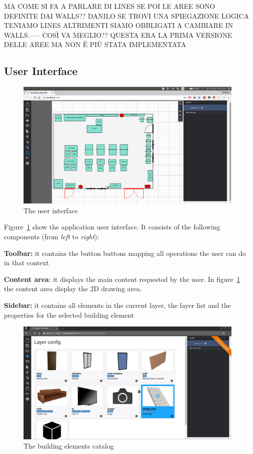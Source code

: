 MA COME SI FA A PARLARE DI LINES SE POI LE AREE SONO DEFINITE DAI WALLS?? DANILO SE TROVI UNA SPIEGAZIONE LOGICA TENIAMO LINES ALTRIMENTI SIAMO OBBLIGATI A CAMBIARE IN WALLS.----- COS\`I VA MEGLIO?? QUESTA ERA LA PRIMA VERSIONE DELLE AREE MA NON \`E PI\`U STATA IMPLEMENTATA


\subsection{User Interface}\label{ssec:ui}

\begin{figure}[htb]
\centering
\includegraphics[width=\linewidth]{contents/images/fig2d}
\caption{The user interface}
\label{fig2D}
\end{figure}

Figure~\ref{fig2D} show the application user interface. It consists of the following components (from \textit{left} to \textit{right}):

\textbf{Toolbar:} it contains the button buttons mapping all operations the user can do in that context

\textbf{Content area}: it displays the main content requested by the user. In figure~\ref{fig2D} the content area display the 2D drawing area.

\textbf{Sidebar:} it contains all elements in the current layer, the layer list and the properties for the selected building element\\

\begin{figure}[htb]
\centering
\includegraphics[width=\linewidth]{contents/images/figcatalog}
\caption{The building elements catalog}
\label{figCatalogo}
\end{figure}


